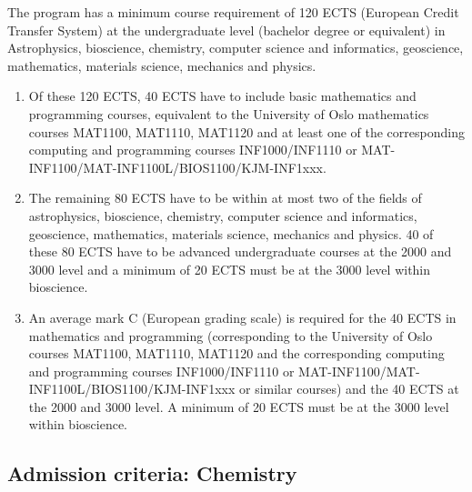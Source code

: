 \documentclass[%
oneside,                 %
final,                   %
10pt]{article}
\begin{document}
The program has a minimum course requirement of 120 ECTS (European Credit Transfer System) at the undergraduate level (bachelor degree or equivalent) in Astrophysics, bioscience, chemistry, computer science and informatics, geoscience, mathematics, materials science, mechanics and physics. 
\begin{enumerate}
\item Of these 120 ECTS, 40 ECTS have to include basic mathematics and programming courses, equivalent to the University of Oslo mathematics courses MAT1100, MAT1110, MAT1120 and at least one of the corresponding computing and programming courses INF1000/INF1110 or MAT-INF1100/MAT-INF1100L/BIOS1100/KJM-INF1xxx. 

\item The remaining 80 ECTS have to be within at most two of the fields of astrophysics, bioscience, chemistry, computer science and informatics, geoscience, mathematics, materials science, mechanics and physics. 40 of these 80 ECTS have to be advanced undergraduate courses at the 2000 and 3000 level and a minimum of 20 ECTS must be at the 3000 level within bioscience. 

\item An average mark C (European grading scale) is required for the 40 ECTS in mathematics and programming (corresponding  to the University of Oslo courses  MAT1100, MAT1110, MAT1120  and the corresponding computing and programming courses INF1000/INF1110 or MAT-INF1100/MAT-INF1100L/BIOS1100/KJM-INF1xxx or similar courses) and the 40 ECTS at the 2000 and 3000 level. A minimum of 20 ECTS must be at the 3000 level within bioscience.
\end{enumerate}

\noindent
\subsection*{Admission criteria: Chemistry}
\end{document}
